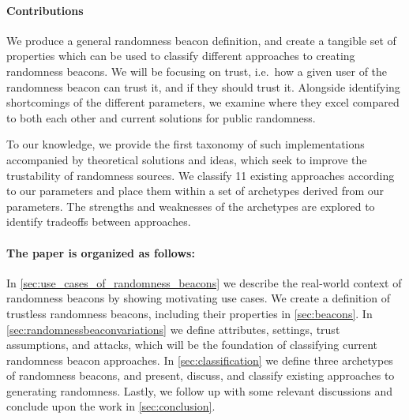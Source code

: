 \paragraph{Contributions}\label{subsec:contributions}
We produce a general randomness beacon definition, and create a tangible set of properties which can be used to classify different approaches to creating randomness beacons.
We will be focusing on trust, i.e.\ how a given user of the randomness beacon can trust it, and if they should trust it.
Alongside identifying shortcomings of the different parameters, we examine where they excel compared to both each other and current solutions for public randomness.

To our knowledge, we provide the first taxonomy of such implementations accompanied by theoretical solutions and ideas, which seek to improve the trustability of randomness sources.
We classify 11 existing approaches according to our parameters and place them within a set of archetypes derived from our parameters. The strengths and weaknesses of the archetypes are explored to identify tradeoffs between approaches.


\paragraph{The paper is organized as follows:}
In \cref{sec:use_cases_of_randomness_beacons} we describe the real-world context of randomness beacons by showing motivating use cases.
We create a definition of trustless randomness beacons, including their properties in \cref{sec:beacons}. In \cref{sec:randomnessbeaconvariations} we define attributes, settings, trust assumptions, and attacks, which will be the foundation of classifying current randomness beacon approaches.
In \cref{sec:classification} we define three archetypes of randomness beacons, and present, discuss, and classify existing approaches to generating randomness.
Lastly, we follow up with some relevant discussions and  conclude upon the work in \cref{sec:conclusion}.
